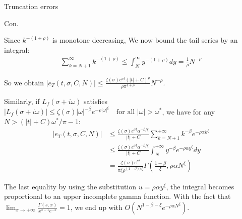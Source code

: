 \documentclass{beamer}
\begin{document}
\begin{frame}{Truncation errors}


    {\footnotesize \scriptsize
    \par Con.
    \par Since \( k^{-(1+\rho)} \) is monotone decreasing, We now bound the tail series by an integral:
    \begin{align*}
        \sum_{k=N+1}^{\infty} k^{-(1+\rho)} \leq \int_{N}^{\infty} y^{-(1+\rho)}  dy = \frac{1}{\rho} N^{-\rho}
    \end{align*}
    \par So we obtain $|e_T(t, \sigma, C, N)| \leq \frac{\zeta(\sigma) e^{\sigma t}(|t| + C)^{\rho}}{\rho \pi^{1+\rho}} N^{-\rho}$.
    \par  \pause  Similarly, if \( L_f(\sigma + i\omega) \) satisfies $ |L_f(\sigma + i\omega)| \leq \zeta(\sigma)|\omega|^{-\beta}e^{-\rho|\omega|^\xi} \quad \text{for all } |\omega| > \omega^*$,
     we have for any \( N > (|t| + C)\omega^*/\pi - 1 \):
     \vspace{-1em}
     \begin{align*}
        |e_T(t, \sigma, C, N)|& \leq \frac{\zeta(\sigma)e^{\sigma t}\alpha^{-\beta/\xi}}{|t| + C} 
        \sum_{k=N+1}^{+\infty} k^{-\beta} e^{-\rho\alpha k^{\xi}}\\
        &\leq \frac{\zeta(\sigma)e^{\sigma t}\alpha^{-\beta/\xi}}{|t| + C} \int_{N}^{+\infty} y^{-\beta} e^{-\rho\alpha y^{\xi}}  dy\\
        &= \frac{\zeta(\sigma)e^{\sigma t}}{\pi \xi \rho^{(1-\beta)/\xi}} \Gamma \left(\frac{1 - \beta}{\xi}, \rho \alpha N^{\xi}\right)
     \end{align*}
     \par  \pause The last equality by using the substitution \( u = \rho \alpha y^\xi \),
      the integral becomes proportional to an upper incomplete gamma function. With the fact that $\lim_{x \to +\infty} \frac{\Gamma(s, x)}{x^{s-1}e^{-x}} = 1$, we end up with $O(N^{1 - \beta - \xi} e^{-\rho \alpha N^\xi})$.
    }
    
\end{frame}
\end{document}
